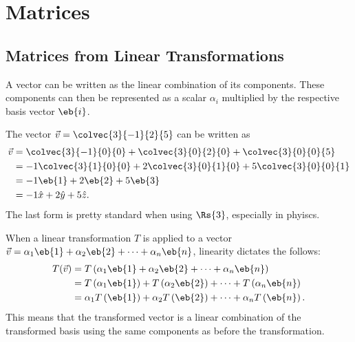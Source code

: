 \chapter{Matrices}
\section{Matrices from Linear Transformations}
A vector can be written as the linear combination of its components. These components can then be represented as a scalar $\alpha_{i}$ multiplied by the respective basis vector $\eb{i}$.
\begin{example}
  The vector $\vec{v}=\colvec{3}{-1}{2}{5}$ can be written as
  \begin{align*}
	\vec{v} &= \colvec{3}{-1}{0}{0} + \colvec{3}{0}{2}{0} + \colvec{3}{0}{0}{5}\\
	&= -1\colvec{3}{1}{0}{0} + 2\colvec{3}{0}{1}{0} + 5\colvec{3}{0}{0}{1}\\
	&= -1\eb{1} + 2\eb{2} + 5\eb{3}\\
	&= -1\hat{x} + 2\hat{y} + 5\hat{z}.
  \end{align*}
  The last form is pretty standard when using $\Rs{3}$, especially in phyiscs.
\end{example}

When a linear transformation $T$ is applied to a vector $\vec{v}=\alpha_{1}\eb{1} + \alpha_{2}\eb{2} + \dots + \alpha_{n}\eb{n}$, linearity dictates the follows:
\begin{align*}
  T(\vec{v}) &= T\left(\alpha_{1}\eb{1} + \alpha_{2}\eb{2} + \dots + \alpha_{n}\eb{n}\right)\\
  &= T\left( \alpha_{1}\eb{1} \right) + T\left( \alpha_{2}\eb{2} \right) + \dots + T\left( \alpha_{n}\eb{n} \right)\\
  &= \alpha_{1}T\left( \eb{1} \right) + \alpha_{2}T\left( \eb{2} \right) + \dots + \alpha_{n}T\left( \eb{n} \right).
\end{align*}
This means that the transformed vector is a linear combination of the transformed basis using the same components as before the transformation.

